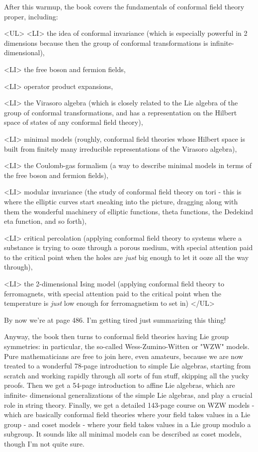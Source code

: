 After this warmup, the book covers the fundamentals of conformal field
theory proper, including:

<UL>
<LI> the idea of conformal invariance (which is especially powerful in 2
dimensions because then the group of conformal transformations is
infinite-dimensional),

<LI> the free boson and fermion fields,

<LI> operator product expansions, 

<LI> the Virasoro algebra (which is closely related to the Lie algebra of
the group of conformal transformations, and has a representation on the
Hilbert space of states of any conformal field theory), 

<LI> minimal models (roughly, conformal field theories whose Hilbert space 
is built from finitely many irreducible representations of the Virasoro 
algebra),

<LI> the Coulomb-gas formalism (a way to describe minimal models in terms
of the free boson and fermion fields),

<LI> modular invariance (the study of conformal field theory on tori - 
this is where the elliptic curves start sneaking into the picture, 
dragging along with them the wonderful machinery of elliptic functions,
theta functions, the Dedekind eta function, and so forth),

<LI> critical percolation (applying conformal field theory to systems
where a substance is trying to ooze through a porous medium, with
special attention paid to the critical point when the holes are \emph{just}
big enough to let it ooze all the way through),

<LI> the 2-dimensional Ising model (applying conformal field theory to
ferromagnets, with special attention paid to the critical point when
the temperature is \emph{just} low enough for ferromagnetism to set in)
</UL>

By now we're at page 486.  I'm getting tired just summarizing this thing!

Anyway, the book then turns to conformal field theories having Lie group
symmetries: in particular, the so-called Wess-Zumino-Witten or "WZW"
models.  Pure mathematicians are free to join here, even amateurs,
because we are now treated to a wonderful 78-page introduction to simple
Lie algebras, starting from scratch and working rapidly through all
sorts of fun stuff, skipping all the yucky proofs.   Then we get a
54-page introduction to affine Lie algebras, which are infinite-
dimensional generalizations of the simple Lie algebras, and play a
crucial role in string theory.  Finally, we get a detailed 143-page
course on WZW models -  which are basically conformal field theories
where your field takes values in a Lie group - and coset models - where
your field takes values in a Lie group modulo a subgroup.   It sounds
like all minimal models can be described as coset models, though I'm 
not quite sure.


